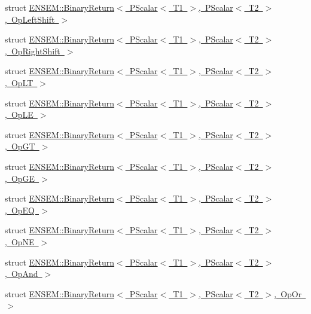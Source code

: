\begin{DoxyCompactItemize}
\item 
struct \mbox{\hyperlink{structENSEM_1_1BinaryReturn_3_01PScalar_3_01T1_01_4_00_01PScalar_3_01T2_01_4_00_01OpLeftShift_01_4}{E\+N\+S\+E\+M\+::\+Binary\+Return$<$ P\+Scalar$<$ T1 $>$, P\+Scalar$<$ T2 $>$, Op\+Left\+Shift $>$}}
\item 
struct \mbox{\hyperlink{structENSEM_1_1BinaryReturn_3_01PScalar_3_01T1_01_4_00_01PScalar_3_01T2_01_4_00_01OpRightShift_01_4}{E\+N\+S\+E\+M\+::\+Binary\+Return$<$ P\+Scalar$<$ T1 $>$, P\+Scalar$<$ T2 $>$, Op\+Right\+Shift $>$}}
\item 
struct \mbox{\hyperlink{structENSEM_1_1BinaryReturn_3_01PScalar_3_01T1_01_4_00_01PScalar_3_01T2_01_4_00_01OpLT_01_4}{E\+N\+S\+E\+M\+::\+Binary\+Return$<$ P\+Scalar$<$ T1 $>$, P\+Scalar$<$ T2 $>$, Op\+L\+T $>$}}
\item 
struct \mbox{\hyperlink{structENSEM_1_1BinaryReturn_3_01PScalar_3_01T1_01_4_00_01PScalar_3_01T2_01_4_00_01OpLE_01_4}{E\+N\+S\+E\+M\+::\+Binary\+Return$<$ P\+Scalar$<$ T1 $>$, P\+Scalar$<$ T2 $>$, Op\+L\+E $>$}}
\item 
struct \mbox{\hyperlink{structENSEM_1_1BinaryReturn_3_01PScalar_3_01T1_01_4_00_01PScalar_3_01T2_01_4_00_01OpGT_01_4}{E\+N\+S\+E\+M\+::\+Binary\+Return$<$ P\+Scalar$<$ T1 $>$, P\+Scalar$<$ T2 $>$, Op\+G\+T $>$}}
\item 
struct \mbox{\hyperlink{structENSEM_1_1BinaryReturn_3_01PScalar_3_01T1_01_4_00_01PScalar_3_01T2_01_4_00_01OpGE_01_4}{E\+N\+S\+E\+M\+::\+Binary\+Return$<$ P\+Scalar$<$ T1 $>$, P\+Scalar$<$ T2 $>$, Op\+G\+E $>$}}
\item 
struct \mbox{\hyperlink{structENSEM_1_1BinaryReturn_3_01PScalar_3_01T1_01_4_00_01PScalar_3_01T2_01_4_00_01OpEQ_01_4}{E\+N\+S\+E\+M\+::\+Binary\+Return$<$ P\+Scalar$<$ T1 $>$, P\+Scalar$<$ T2 $>$, Op\+E\+Q $>$}}
\item 
struct \mbox{\hyperlink{structENSEM_1_1BinaryReturn_3_01PScalar_3_01T1_01_4_00_01PScalar_3_01T2_01_4_00_01OpNE_01_4}{E\+N\+S\+E\+M\+::\+Binary\+Return$<$ P\+Scalar$<$ T1 $>$, P\+Scalar$<$ T2 $>$, Op\+N\+E $>$}}
\item 
struct \mbox{\hyperlink{structENSEM_1_1BinaryReturn_3_01PScalar_3_01T1_01_4_00_01PScalar_3_01T2_01_4_00_01OpAnd_01_4}{E\+N\+S\+E\+M\+::\+Binary\+Return$<$ P\+Scalar$<$ T1 $>$, P\+Scalar$<$ T2 $>$, Op\+And $>$}}
\item 
struct \mbox{\hyperlink{structENSEM_1_1BinaryReturn_3_01PScalar_3_01T1_01_4_00_01PScalar_3_01T2_01_4_00_01OpOr_01_4}{E\+N\+S\+E\+M\+::\+Binary\+Return$<$ P\+Scalar$<$ T1 $>$, P\+Scalar$<$ T2 $>$, Op\+Or $>$}}

\end{DoxyCompactItemize}
